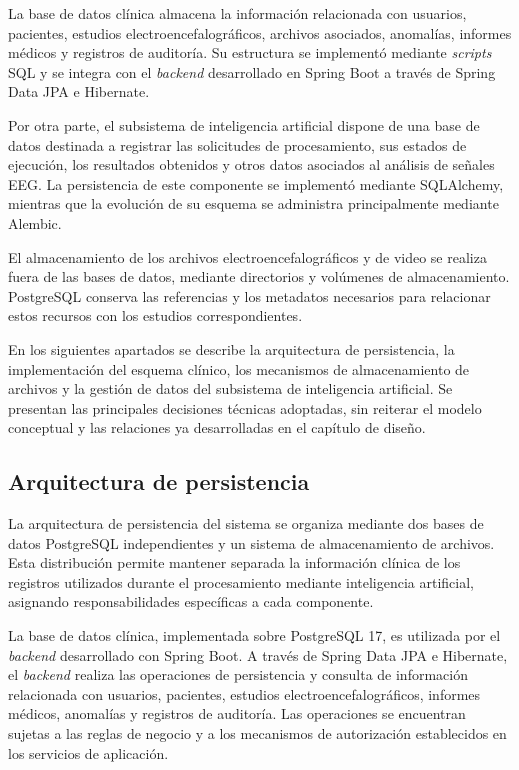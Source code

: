 La base de datos clínica almacena la información relacionada
con usuarios, pacientes, estudios electroencefalográficos,
archivos asociados, anomalías, informes médicos y registros
de auditoría. Su estructura se implementó mediante \textit{scripts}
SQL y se integra con el \textit{backend} desarrollado en Spring Boot
a través de Spring Data JPA e Hibernate.

Por otra parte, el subsistema de inteligencia artificial
dispone de una base de datos destinada a registrar las
solicitudes de procesamiento, sus estados de ejecución,
los resultados obtenidos y otros datos asociados al análisis
de señales EEG. La persistencia de este componente se
implementó mediante SQLAlchemy, mientras que la evolución
de su esquema se administra principalmente mediante Alembic.

El almacenamiento de los archivos electroencefalográficos
y de video se realiza fuera de las bases de datos, mediante
directorios y volúmenes de almacenamiento. PostgreSQL conserva
las referencias y los metadatos necesarios para relacionar
estos recursos con los estudios correspondientes.

En los siguientes apartados se describe la arquitectura de
persistencia, la implementación del esquema clínico, los
mecanismos de almacenamiento de archivos y la gestión de
datos del subsistema de inteligencia artificial. Se
presentan las principales decisiones técnicas adoptadas,
sin reiterar el modelo conceptual y las relaciones ya
desarrolladas en el capítulo de diseño.


\subsection{Arquitectura de persistencia}

La arquitectura de persistencia del sistema se organiza mediante
dos bases de datos PostgreSQL independientes y un sistema de
almacenamiento de archivos. Esta distribución permite mantener
separada la información clínica de los registros utilizados
durante el procesamiento mediante inteligencia artificial,
asignando responsabilidades específicas a cada componente.

La base de datos clínica, implementada sobre PostgreSQL 17,
es utilizada por el \textit{backend} desarrollado con Spring Boot.
A través de Spring Data JPA e Hibernate, el \textit{backend} realiza
las operaciones de persistencia y consulta de información
relacionada con usuarios, pacientes, estudios
electroencefalográficos, informes médicos, anomalías y
registros de auditoría. Las operaciones se encuentran
sujetas a las reglas de negocio y a los mecanismos de
autorización establecidos en los servicios de aplicación.


